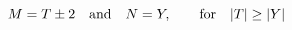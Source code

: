 \begin{equation}
M=T\pm 2 \quad\hbox{and}\quad N=Y, \qquad\hbox{for}\quad |T|\ge |Y|
\end{equation}

